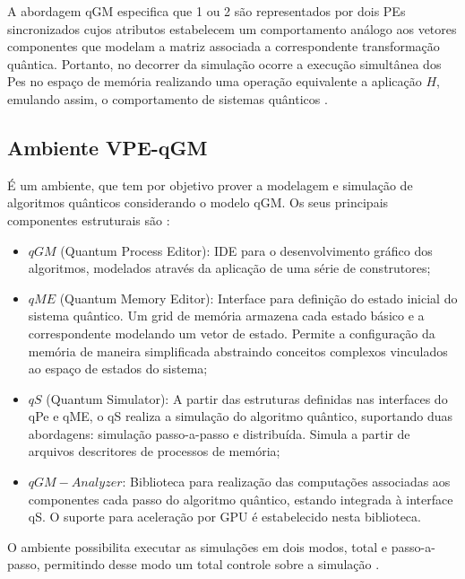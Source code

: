 \documentclass[tcc,capa]{texufpel}
\begin{document}
A abordagem qGM especifica que 1 ou 2 são representados por dois PEs sincronizados cujos atributos estabelecem um comportamento análogo aos vetores componentes que modelam a matriz associada a correspondente transformação quântica. Portanto, no decorrer da simulação ocorre a execução simultânea dos Pes no espaço de memória realizando uma operação equivalente a aplicação $H$, emulando assim, o comportamento de sistemas quânticos \cite{Schmalfuss14}.



\subsection{Ambiente VPE-qGM}

É um ambiente, que tem por objetivo prover a modelagem e simulação de algoritmos quânticos considerando o modelo qGM. Os seus principais componentes estruturais são \cite{maron:2013:ccgrid}:

\begin{itemize}
    \item $qGM$ (Quantum Process Editor): IDE para o desenvolvimento gráfico dos algoritmos, modelados através da aplicação de uma série de construtores;
    
    \item $qME$ (Quantum Memory Editor): Interface para definição do estado inicial do sistema quântico. Um grid de memória armazena cada estado básico e a correspondente modelando um vetor de estado. Permite a configuração da memória de maneira simplificada abstraindo conceitos complexos vinculados ao espaço de estados do sistema; 
    
    \item $qS$ (Quantum Simulator): A partir das estruturas definidas nas interfaces do qPe e qME, o qS realiza a simulação do algoritmo quântico, suportando duas abordagens: simulação passo-a-passo e distribuída. Simula a partir de arquivos descritores de processos de memória;
    
    \item $qGM-Analyzer$: Biblioteca para realização das computações associadas aos componentes cada passo do algoritmo quântico, estando integrada à interface qS. O suporte para aceleração por GPU é estabelecido nesta biblioteca.
    
\end{itemize}

O ambiente possibilita executar as simulações em dois modos, total e passo-a-passo, permitindo desse modo um total controle sobre a simulação \cite{MARON10}.
\end{document}
